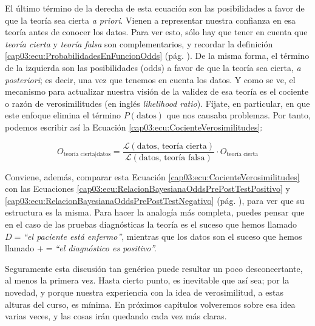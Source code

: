El último término de la derecha de esta ecuación son las posibilidades a favor de que la teoría sea cierta {\em a priori}. Vienen a representar nuestra confianza en esa teoría antes de conocer los datos. Para ver esto, sólo hay que tener en cuenta que {\em teoría cierta} y {\em teoría falsa} son complementarios, y recordar la definición \ref{cap03:ecu:ProbabilidadesEnFuncionOdds} (pág. \pageref{cap03:ecu:ProbabilidadesEnFuncionOdds}). De la misma forma, el término de la izquierda son las posibilidades (odds) a favor de que la teoría sea cierta, {\em a posteriori}; es decir, una vez que tenemos en cuenta los datos. Y como se ve, el mecanismo para actualizar nuestra visión de la validez de esa teoría es el {\sf cociente o razón de verosimilitudes} (en inglés {\em likelihood ratio}). Fíjate, en particular, en que este enfoque elimina el término $P(\mbox{datos})$ que nos causaba problemas. Por tanto, podemos escribir así la Ecuación \ref{cap03:ecu:CocienteVerosimilitudes}:

\begin{equation}
\label{cap03:ecu:OddsCocienteVerosimilitudes}
O_{\mbox{teoría cierta}|\mbox{datos}}=
\dfrac{\mathcal{L}(\mbox{datos, teoría cierta})}{\mathcal{L}(\mbox{datos, teoría falsa})}
\cdot
O_{\mbox{teoría cierta}}
\end{equation}

Conviene, además, comparar esta Ecuación \ref{cap03:ecu:CocienteVerosimilitudes} con las Ecuaciones \ref{cap03:ecu:RelacionBayesianaOddsPrePostTestPositivo} y \ref{cap03:ecu:RelacionBayesianaOddsPrePostTestNegativo} (pág. \pageref{cap03:ecu:RelacionBayesianaOddsPrePostTestPositivo}), para ver que su estructura es la misma. Para hacer la analogía más completa, puedes pensar que en el caso de las pruebas diagnósticas la teoría es el suceso que hemos llamado $D =${\em ``el paciente está enfermo''}, mientras que los datos son el suceso que hemos llamado $+ = ${\em ``el diagnóstico es positivo''.}

Seguramente esta discusión tan genérica puede resultar un poco desconcertante, al menos la primera vez. Hasta cierto punto, es inevitable que así sea; por la novedad, y porque nuestra experiencia con la idea de verosimilitud, a estas alturas del curso, es mínima. En próximos capítulos volveremos sobre esa idea varias veces, y las cosas irán quedando cada vez más claras.

